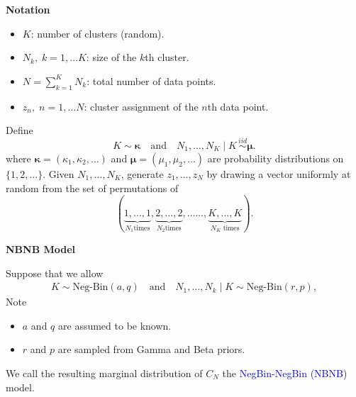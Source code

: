 \documentclass[portrait,a0b,final]{a0poster}
\newcommand{\clusters}{\bm{\kappa}}
\newcommand{\cluster}[1]{\kappa_{#1}}
\newcommand{\sizes}{\bm{\mu}}
\newcommand{\size}[1]{\mu_{#1}}
\newcommand{\shape}{\eta}
\newcommand{\rate}{s}
\newcommand{\betaA}{u}
\newcommand{\betaB}{v}
\newenvironment{poster}{
  \begin{center}
  \begin{minipage}[c]{0.98\textwidth}
}{
  \end{minipage}
  \end{center}
}
\begin{document}
\begin{poster}
\begin{multicols}{3}
\begin{center}
\textbf{Notation}
\end{center}

\begin{itemize}
\item $K$:  number of clusters (random).
\item $N_k, \; k=1,\ldots K$: size of the $k$th cluster. 
\item $N = \sum_{k=1}^K N_k$: total number of data points.
\item $z_n, \; n=1,\ldots N$: cluster assignment of the $n$th data point.
\end{itemize}

Define
\begin{equation}
  K \sim \clusters \quad \textrm{and} \quad
 N_1,\ldots, N_K \mid K\,\stackrel{iid}\sim  \sizes.
\label{eq:FMMC}
\end{equation}
where $\clusters=(\cluster{1},\cluster{2},\dots)$ and $\sizes=(\size{1},\size{2},\dots)$ are probability distributions on $\{1,2,\ldots\}$. Given $N_1, \ldots, N_K$, generate 
$z_1, \ldots, z_N$ by drawing a vector uniformly at random from the
set of permutations of 
$$(\underbrace{1,\ldots,1}_\text{$N_1$
  times},\underbrace{2,\ldots,2}_\text{$N_2$
  times},\ldots\ldots,\underbrace{K,\ldots,K}_\text{$N_K$ times}).$$
  


\vspace*{1em}
 
\begin{center}
\textbf{NBNB Model}
\end{center}  
  
Suppose that we allow 
\begin{align*}
K \sim \text{Neg-Bin}(a,q)
\quad \textrm{and} \quad
N_1,\ldots, N_k \mid K \sim \text{Neg-Bin}(r,p),
\end{align*}
Note
\begin{itemize}
\item $a$ and $q$ are assumed to be known.
\item $r$ and $p$ are sampled from
Gamma and Beta priors.
%
\end{itemize}
We call the resulting marginal distribution of $C_N$ the \textcolor{blue}{NegBin-NegBin (NBNB)} model.
 

\end{multicols}
\end{poster}
\end{document}
